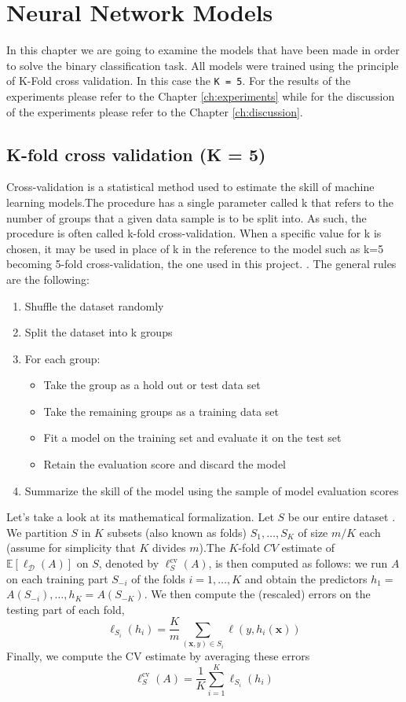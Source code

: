 \chapter{Neural Network Models} \label{ch:nnm}
In this chapter we are going to examine the models that have been made in order to solve the binary classification task.
All models were trained using the principle of K-Fold cross validation. In this case the \texttt{K = 5}. For the results of the experiments please refer to the Chapter \ref{ch:experiments} while for the discussion of the experiments please refer to the Chapter \ref{ch:discussion}.

\section{K-fold cross validation (K = 5)}
Cross-validation is a statistical method used to estimate the skill of machine learning models.The procedure has a single parameter called k that refers to the number of groups that a given data sample is to be split into. As such, the procedure is often called k-fold cross-validation. When a specific value for k is chosen, it may be used in place of k in the reference to the model such as k=5 becoming 5-fold cross-validation, the one used in this project. \cite{kfold}.
The general rules are the following:
\begin{enumerate}
\item Shuffle the dataset randomly
\item Split the dataset into k groups
\item For each group:
\begin{itemize}
\item Take the group as a hold out or test data set
\item Take the remaining groups as a training data set
\item Fit a model on the training set and evaluate it on the test set
\item Retain the evaluation score and discard the model
\end{itemize}
\item Summarize the skill of the model using the sample of model evaluation scores
\end{enumerate}
Let's take a look at its mathematical formalization.
Let $S$ be our entire dataset \cite{kfoldmath}. We partition $S$ in $K$ subsets (also known as folds) $S_1, \ldots, S_K$ of size $m / K$ each (assume for simplicity that $K$ divides $m$).The $K$-fold $C V$ estimate of $\mathbb{E}\left[\ell_{\mathcal{D}}(A)\right]$ on $S$, denoted by $\ell_S^{\mathrm{cv}}(A)$, is then computed as follows: we run $A$ on each training part $S_{-i}$ of the folds $i=1, \ldots, K$ and obtain the predictors $h_1=$ $A\left(S_{-i}\right), \ldots, h_K=A\left(S_{-K}\right)$. We then compute the (rescaled) errors on the testing part of each fold,
$$
\ell_{S_i}\left(h_i\right)=\frac{K}{m} \sum_{(\boldsymbol{x}, y) \in S_i} \ell\left(y, h_i(\boldsymbol{x})\right)
$$
Finally, we compute the CV estimate by averaging these errors
$$
\ell_S^{\mathrm{cv}}(A)=\frac{1}{K} \sum_{i=1}^K \ell_{S_i}\left(h_i\right)
$$
